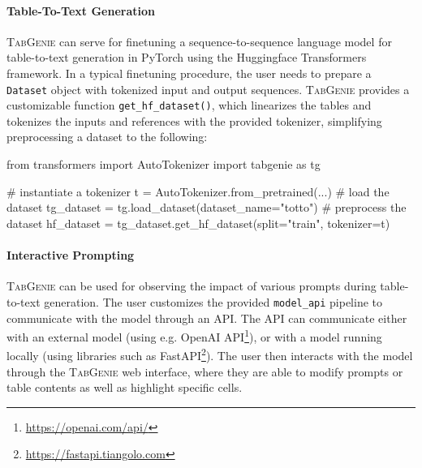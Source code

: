 \paragraph{Table-To-Text Generation} \textsc{TabGenie} can serve for finetuning a sequence-to-sequence language model for table-to-text generation in PyTorch \cite{paszke2019pytorch} using the Huggingface Transformers \cite{wolf2019HuggingFacesTS} framework. In a typical finetuning procedure, the user needs to prepare a \texttt{Dataset} object with tokenized input and output sequences. \textsc{TabGenie} provides a customizable function \texttt{get\_hf\_dataset()}, which linearizes the tables and tokenizes the inputs and references with the provided tokenizer, simplifying preprocessing a dataset to the following:
\begin{python}
from transformers import AutoTokenizer
import tabgenie as tg

# instantiate a tokenizer
t = AutoTokenizer.from_pretrained(...)
# load the dataset
tg_dataset = tg.load_dataset(dataset_name="totto")
# preprocess the dataset
hf_dataset = tg_dataset.get_hf_dataset(split="train", tokenizer=t)
\end{python}



\paragraph{Interactive Prompting} \textsc{TabGenie} can be used for observing the impact of various prompts during table-to-text generation. The user customizes the provided \texttt{model\_api} pipeline to communicate with the model through an API. The API can communicate either with an external model (using e.g. OpenAI API\footnote{\url{https://openai.com/api/}}), or with a model running locally (using libraries such as FastAPI\footnote{\url{https://fastapi.tiangolo.com}}). The user then interacts with the model through the \textsc{TabGenie} web interface, where they are able to modify prompts or table contents as well as highlight specific cells.

